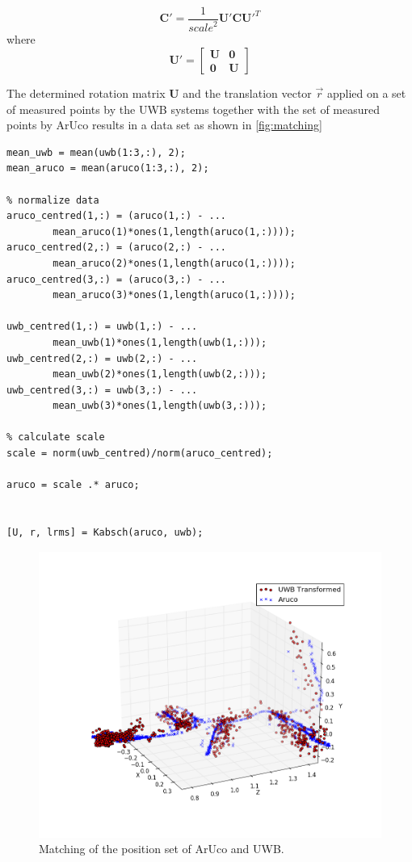\begin{equation}
	\textbf{C}' = \frac{1}{\mathit{scale}^2} \textbf{U}' \textbf{C} \textbf{U}'^T
\end{equation}
where
\begin{equation}
	\textbf{U}' =
	\begin{bmatrix}
		\textbf{U} & \textbf{0} \\
		\textbf{0} & \textbf{U}
	\end{bmatrix}
\end{equation}

The determined rotation matrix $\textbf{U}$ and the translation vector $\vec r$ applied on a set of measured points by the \ac{UWB} systems together with the set of measured points by ArUco results in a data set as shown in \autoref{fig:matching}

\lstset{language=Matlab}
\begin{lstlisting}[frame=single, caption=Matching proceeder, label=lst:matching]
% Calculate mean
mean_uwb = mean(uwb(1:3,:), 2);
mean_aruco = mean(aruco(1:3,:), 2);
	
% normalize data	
aruco_centred(1,:) = (aruco(1,:) - ...
		mean_aruco(1)*ones(1,length(aruco(1,:))));
aruco_centred(2,:) = (aruco(2,:) - ...
		mean_aruco(2)*ones(1,length(aruco(1,:))));
aruco_centred(3,:) = (aruco(3,:) - ...
		mean_aruco(3)*ones(1,length(aruco(1,:))));

uwb_centred(1,:) = uwb(1,:) - ...
		mean_uwb(1)*ones(1,length(uwb(1,:)));
uwb_centred(2,:) = uwb(2,:) - ...
		mean_uwb(2)*ones(1,length(uwb(2,:)));
uwb_centred(3,:) = uwb(3,:) - ...
		mean_uwb(3)*ones(1,length(uwb(3,:)));
	
% calculate scale
scale = norm(uwb_centred)/norm(aruco_centred);
	
aruco = scale .* aruco;
	
	
[U, r, lrms] = Kabsch(aruco, uwb);
\end{lstlisting}



\begin{figure}[ht!]\centering
	\includegraphics[width=1.0\textwidth]{figures/matching}
	\caption{Matching of the position set of ArUco and \ac{UWB}.}\label{fig:matching}
\end{figure} 

